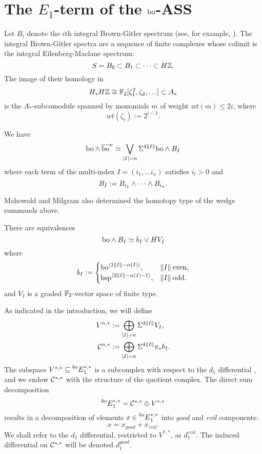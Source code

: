 
\section{The $E_1$-term of the $\mathrm{bo}$-ASS}\label{sec:E1}

Let $B_i$ denote the $i$th integral Brown-Gitler spectrum (see, for example, \cite{CDGM}).  The integral Brown-Gitler spectra are a sequence of finite complexes whose colimit is the integral Eilenberg-Maclane spectrum:
$$ S = B_0 \subset B_1 \subset \cdots \subset H\mathbb{Z}. $$
The image of their homology in 
$$ H_* H\mathbb{Z} \cong \mathbb{F}_2[\zeta_1^2, \zeta_2, \ldots ] \subset A_* $$
is the $A_*$-subcomodule spanned by monomials $m$ of weight $wt(m) \le 2i$, where
$$ wt(\zeta_i) := 2^{i-1}. $$

\begin{thm}\label{thm:splitting}
	We have
	$$ \mathrm{bo} \wedge \overline{\mathrm{bo}}^n \simeq \bigvee_{\lvert I \rvert = n} \Sigma^{4\lVert I \rVert} \mathrm{bo} \wedge B_I $$
	 where each term of the multi-index $I = (i_1, \ldots i_n)$ satisfies $i_l > 0$ and 
	 $$ B_I := B_{i_1} \wedge \cdots \wedge B_{i_n}. $$
\end{thm}

Mahowald and Milgram also determined the homotopy type of the wedge summands above.

\begin{thm}
	There are equivalences
	$$ \mathrm{bo} \wedge B_I \simeq b_I \vee HV_I $$
	where
	$$ b_I := 
	\begin{cases}
	\mathrm{bo}^{\langle 2\lVert I \rVert-\alpha(I) \rangle}, & \lVert I \rVert \: \mathrm{even}, \\
	\mathrm{bsp}^{\langle 2\lVert I \rVert-\alpha(I)-1 \rangle}, & \lVert I \rVert \: \mathrm{odd}. \\
	\end{cases}
	$$
	and $V_I$ is a graded $\mathbb{F}_2$-vector space of finite type.
\end{thm}

As indicated in the introduction, we will define 
\begin{align*}
V^{n,*} &:= \bigoplus_{\lvert I \rvert = n} \Sigma^{4\lVert I \rVert} V_I, \\
\mathcal{C}^{n,*} &:= \bigoplus_{\lvert I \rvert = n} \Sigma^{4\lVert I \rVert} \pi_* b_I.
\end{align*}
The subspace $V^{*,*} \subseteq \prescript{bo}{}{E}_1^{*,*} $ is a subcomplex with respect to the $d_1$ differential \cite{LM}, and we endow $\mathcal{C}^{*,*}$ with the structure of the quotient complex.
The direct sum decomposition
$$ \prescript{bo}{}{E}^{*,*}_1 = \mathcal{C}^{*,*} \oplus V^{*,*} $$
results in a decomposition of elements $x \in \prescript{bo}{}{E}_1^{*,*}$ into \emph{good} and \emph{evil} components:
$$ x = x_{good} + x_{evil}. $$ 
We shall refer to the $d_1$ differential, restricted to $V^{*,*}$, as $d^{evil}_1$.  The induced differential on $\mathcal{C}^{*,*}$ will be denoted $d_1^{good}$. 

